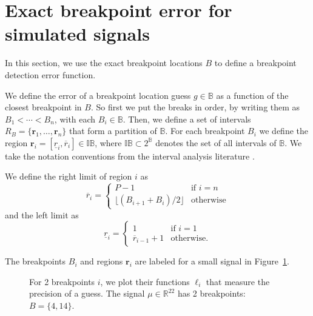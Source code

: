 \documentclass{jsfds} %
\renewcommand{\r}{ \mathbf{ r} }
\newcommand{\rileft}[1][i]{\underline r_{#1}}
\newcommand{\riright}[1][i]{\overline r_{#1}}
\newcommand{\RR}{\mathbb{R}}
\begin{document}
\newpage

\section{Exact breakpoint error for simulated signals}
\label{sec:breakpoint_error}

In this section, we use the exact breakpoint locations $B$ to define a
breakpoint detection error function.

We define the error of a breakpoint location guess $g\in\mathbb
B$ as a function of the closest breakpoint in $B$. So
first we put the breaks in order, by writing them as $B_1<\cdots<
B_n$, with each $B_i\in\mathbb B$. Then, we define a set of intervals
$R_B=\{\r_1,\dots,\r_n\}$ that form a partition of $\mathbb B$. For each
breakpoint $B_i$ we define the region
${\r}_i=[\rileft,\riright]\in\mathbb I \mathbb B$, where $\mathbb
I\mathbb B\subset 2^{\mathbb B}$ denotes the set of all intervals of
$\mathbb B$. We take the notation conventions from the interval
analysis literature \citep{intervals}.

We define the right limit of region $i$ as
\begin{equation}
  \label{eq:R_i}
\riright
=
  \begin{cases}
    P-1 & \text{if } i=n \\
    \lfloor (B_{i+1}+B_i)/2 \rfloor & \text{otherwise}
  \end{cases}
\end{equation}
and
the left limit as
\begin{equation}
  \label{eq:L_i}
  \rileft =
  \begin{cases}
    1 & \text{if } i=1 \\
    \riright[i-1]+1 & \text{otherwise}.
  \end{cases}
\end{equation}

The breakpoints $B_i$ and regions $\r_i$ are labeled for a small
signal in Figure~\ref{fig:exact_imprecision}.

\begin{figure}[b]
  \centering
  
  \caption{For 2 breakpoints $i$, we plot their functions $\ell_i$
    that measure the precision of a guess.
    The signal $\mu\in\RR^{22}$ has 2 breakpoints: $B=\{4,14\}$.}
  \label{fig:exact_imprecision}
\end{figure}
\end{document}

